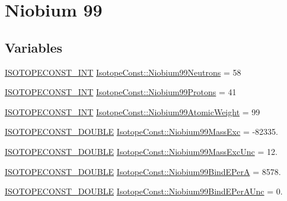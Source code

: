 \hypertarget{group___isotope_const-_niobium-_nb99}{}\section{Niobium 99}
\label{group___isotope_const-_niobium-_nb99}
\subsection*{Variables}
\begin{DoxyCompactItemize}
\item 
\mbox{\hyperlink{group___isotope_const-_macros_ga5f18360b3e99483a35c32d789e62621c}{I\+S\+O\+T\+O\+P\+E\+C\+O\+N\+S\+T\+\_\+\+I\+NT}} \mbox{\hyperlink{group___isotope_const-_niobium-_nb99_gafb5d2f1fc8a84221b69717596f4c81b7}{Isotope\+Const\+::\+Niobium99\+Neutrons}} = 58
\item 
\mbox{\hyperlink{group___isotope_const-_macros_ga5f18360b3e99483a35c32d789e62621c}{I\+S\+O\+T\+O\+P\+E\+C\+O\+N\+S\+T\+\_\+\+I\+NT}} \mbox{\hyperlink{group___isotope_const-_niobium-_nb99_gac4a45e12d620bee9e26d98753522cc8e}{Isotope\+Const\+::\+Niobium99\+Protons}} = 41
\item 
\mbox{\hyperlink{group___isotope_const-_macros_ga5f18360b3e99483a35c32d789e62621c}{I\+S\+O\+T\+O\+P\+E\+C\+O\+N\+S\+T\+\_\+\+I\+NT}} \mbox{\hyperlink{group___isotope_const-_niobium-_nb99_gaa39eb70dfc37f29d15f62086118df005}{Isotope\+Const\+::\+Niobium99\+Atomic\+Weight}} = 99
\item 
\mbox{\hyperlink{group___isotope_const-_macros_ga8f45a7272ce02c0b4c65c44636ed719a}{I\+S\+O\+T\+O\+P\+E\+C\+O\+N\+S\+T\+\_\+\+D\+O\+U\+B\+LE}} \mbox{\hyperlink{group___isotope_const-_niobium-_nb99_ga1a0c64871bbabe5e9585596c9d734c13}{Isotope\+Const\+::\+Niobium99\+Mass\+Exc}} = -\/82335.
\item 
\mbox{\hyperlink{group___isotope_const-_macros_ga8f45a7272ce02c0b4c65c44636ed719a}{I\+S\+O\+T\+O\+P\+E\+C\+O\+N\+S\+T\+\_\+\+D\+O\+U\+B\+LE}} \mbox{\hyperlink{group___isotope_const-_niobium-_nb99_ga165d7c934e20380f9b5711421a72adb0}{Isotope\+Const\+::\+Niobium99\+Mass\+Exc\+Unc}} = 12.
\item 
\mbox{\hyperlink{group___isotope_const-_macros_ga8f45a7272ce02c0b4c65c44636ed719a}{I\+S\+O\+T\+O\+P\+E\+C\+O\+N\+S\+T\+\_\+\+D\+O\+U\+B\+LE}} \mbox{\hyperlink{group___isotope_const-_niobium-_nb99_ga231a90f42293fdd9e040c68ee6df9fbb}{Isotope\+Const\+::\+Niobium99\+Bind\+E\+PerA}} = 8578.
\item 
\mbox{\hyperlink{group___isotope_const-_macros_ga8f45a7272ce02c0b4c65c44636ed719a}{I\+S\+O\+T\+O\+P\+E\+C\+O\+N\+S\+T\+\_\+\+D\+O\+U\+B\+LE}} \mbox{\hyperlink{group___isotope_const-_niobium-_nb99_ga81928e367da4503c685fa8716e4e5669}{Isotope\+Const\+::\+Niobium99\+Bind\+E\+Per\+A\+Unc}} = 0.

\end{DoxyCompactItemize}
